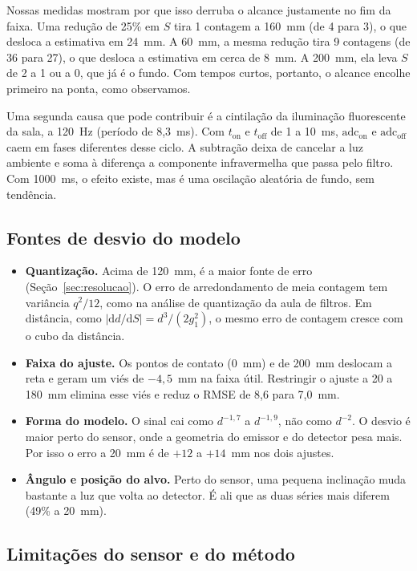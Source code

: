 \documentclass[11pt,a4paper]{article}
\begin{document}
Nossas medidas mostram por que isso derruba o alcance justamente no fim da faixa. Uma redução de 25\% em $S$ tira 1 contagem a 160~mm (de 4 para 3), o que desloca a estimativa em 24~mm. A 60~mm, a mesma redução tira 9 contagens (de 36 para 27), o que desloca a estimativa em cerca de 8~mm. A 200~mm, ela leva $S$ de 2 a 1 ou a 0, que já é o fundo. Com tempos curtos, portanto, o alcance encolhe primeiro na ponta, como observamos.

Uma segunda causa que pode contribuir é a cintilação da iluminação fluorescente da sala, a 120~Hz (período de 8,3~ms). Com $t_{\mathrm{on}}$ e $t_{\mathrm{off}}$ de 1 a 10~ms, $\mathrm{adc}_{\mathrm{on}}$ e $\mathrm{adc}_{\mathrm{off}}$ caem em fases diferentes desse ciclo. A subtração deixa de cancelar a luz ambiente e soma à diferença a componente infravermelha que passa pelo filtro. Com 1000~ms, o efeito existe, mas é uma oscilação aleatória de fundo, sem tendência.

\subsection{Fontes de desvio do modelo}

\begin{itemize}
  \item \textbf{Quantização.} Acima de 120~mm, é a maior fonte de erro (Seção~\ref{sec:resolucao}). O erro de arredondamento de meia contagem tem variância $q^2/12$, como na análise de quantização da aula de filtros. Em distância, como $\lvert \mathrm{d}d/\mathrm{d}S \rvert = d^3/(2g_1^2)$, o mesmo erro de contagem cresce com o cubo da distância.
  \item \textbf{Faixa do ajuste.} Os pontos de contato (0~mm) e de 200~mm deslocam a reta e geram um viés de $-4{,}5$~mm na faixa útil. Restringir o ajuste a 20 a 180~mm elimina esse viés e reduz o RMSE de 8,6 para 7,0~mm.
  \item \textbf{Forma do modelo.} O sinal cai como $d^{-1{,}7}$ a $d^{-1{,}9}$, não como $d^{-2}$. O desvio é maior perto do sensor, onde a geometria do emissor e do detector pesa mais. Por isso o erro a 20~mm é de $+12$ a $+14$~mm nos dois ajustes.
  \item \textbf{Ângulo e posição do alvo.} Perto do sensor, uma pequena inclinação muda bastante a luz que volta ao detector. É ali que as duas séries mais diferem (49\% a 20~mm).
\end{itemize}

\subsection{Limitações do sensor e do método}
\end{document}
